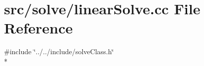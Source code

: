 \section{src/solve/linear\-Solve.cc File Reference}
\label{linear_solve_8cc}
{\ttfamily \#include \char`\"{}../../include/solve\-Class.\-h\char`\"{}}\\*
